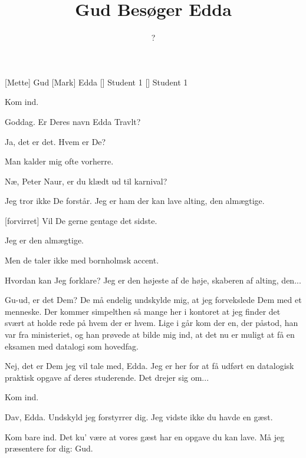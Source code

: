 \documentclass[a4paper,11pt]{article}
\title{Gud Besøger Edda}
\author{?}
\begin{document}
\maketitle

\begin{roles}
  [Mette] Gud
  [Mark] Edda
  [] Student 1
  [] Student 1
\end{roles}

\begin{sketch}

   Kom ind.

   Goddag.  Er Deres navn Edda Travlt?

   Ja, det er det.  Hvem er De?

   Man kalder mig ofte vorherre.

   Næ, Peter Naur, er du klædt ud til karnival?

   Jeg tror ikke De forstår.  Jeg er ham der kan lave alting,
  den almægtige.

  [forvirret] Vil De gerne gentage det sidste.

   Jeg er den almægtige.

   Men de taler ikke med bornholmsk accent.

   Hvordan kan Jeg forklare?  Jeg er den højeste af de høje, skaberen af alting, den...

   Gu-ud, er det Dem?   De må endelig
  undskylde mig, at jeg forvekslede Dem med et menneske.  Der kommer
  simpelthen så mange her i kontoret at jeg finder det svært at holde
  rede på hvem der er hvem.  Lige i går kom der en, der påstod, han var
  fra ministeriet, og han prøvede at bilde mig ind, at det nu er muligt
  at få en eksamen med datalogi som hovedfag.

   Nej, det er Dem jeg vil tale med, Edda.  Jeg er her for at få
  udført en datalogisk praktisk opgave af deres studerende.  Det drejer
  sig om...


   Kom ind.


   Dav, Edda.  Undskyld jeg forstyrrer dig.  Jeg vidste ikke
  du havde en gæst.

   Kom bare ind.  Det ku' være at vores gæst har en opgave du
  kan lave.  Må jeg præsentere for dig: Gud.


\end{sketch}
\end{document}
